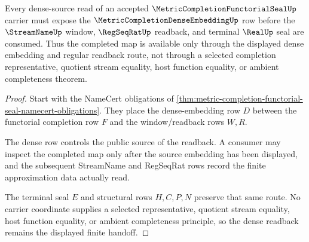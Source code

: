 \begin{theorem}
\label{thm:metric-completion-functorial-seal-dense-readback}
Every dense-source read of an accepted $\MetricCompletionFunctorialSealUp$ carrier must expose the $\MetricCompletionDenseEmbeddingUp$ row before the $\StreamNameUp$ window, $\RegSeqRatUp$ readback, and terminal $\RealUp$ seal are consumed. Thus the completed map is available only through the displayed dense embedding and regular readback route, not through a selected completion representative, quotient stream equality, host function equality, or ambient completeness theorem.
\end{theorem}
\begin{proof}
Start with the NameCert obligations of \autoref{thm:metric-completion-functorial-seal-namecert-obligations}. They place the dense-embedding row $D$ between the functorial completion row $F$ and the window/readback rows $W,R$.

The dense row controls the public source of the readback. A consumer may inspect the completed map only after the source embedding has been displayed, and the subsequent StreamName and RegSeqRat rows record the finite approximation data actually read.

The terminal seal $E$ and structural rows $H,C,P,N$ preserve that same route. No carrier coordinate supplies a selected representative, quotient stream equality, host function equality, or ambient completeness principle, so the dense readback remains the displayed finite handoff.
\end{proof}




